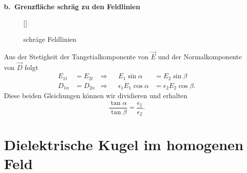 \textbf{b.\ Grenzfläche schräg zu den Feldlinien}\\

\begin{wrapfigure}[10]{l}[0cm]{0cm}
	\raisebox{0pt}[\dimexpr{}\baselineskip\relax]{
		\colorbox{hgrey}{
		}
	}
	\caption{schräge Feldlinien}
\end{wrapfigure}
Aus der Stetigkeit der Tangetialkomponente von $\vec{E}$ und der Normalkomponente von $\vec{D}$ folgt
\begin{align*}
E_{1t}&=E_{2t} &\Rightarrow& & E_1\sin\alpha &=E_2\sin\beta\\
D_{1n}&=D_{2n} &\Rightarrow& &\epsilon_1E_1\cos\alpha &= \epsilon_2E_2\cos\beta.
\end{align*}
Diese beiden Gleichungen können wir dividieren und erhalten
\begin{equation*}
\frac{\tan\alpha}{\tan\beta}=\frac{\epsilon_1}{\epsilon_2}.
\end{equation*}

\section{Dielektrische Kugel im homogenen Feld}


